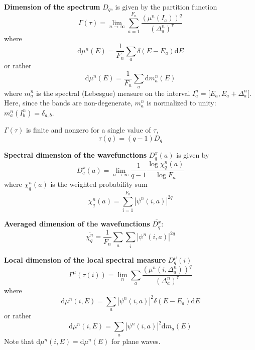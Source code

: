 \documentclass[11pt]{article}
\renewcommand{\d}[1]{\mathrm{d}#1}
\begin{document}
\textbf{Dimension of the spectrum} $\boxed{D_q}$, is given by the partition function
\begin{equation}
	\Gamma(\tau) = \lim_{n\rightarrow \infty} \sum_{a=1}^{F_n} \frac{(\mu^n(I_a))^q}{(\Delta_a^n)^\tau}
\end{equation}
where
\begin{equation}
	\d \mu^n(E) = \frac{1}{F_n}\sum_a \delta(E-E_a) \d E
\end{equation}
or rather
\begin{equation}
	\d \mu^n(E) = \frac{1}{F_n}\sum_a \d{m_a^n}(E)
\end{equation}
where $m_a^n$ is the spectral (Lebesgue) measure on the interval $I_a^n = [E_a,E_a+\Delta_a^n[$.
Here, since the bands are non-degenerate, $m_a^n$ is normalized to unity: $m_a^n(I_b^n)=\delta_{a,b}$.

$\Gamma(\tau)$ is finite and nonzero for a single value of $\tau$, 
\begin{equation}
	\tau(q) = (q-1)D_q
\end{equation}

\textbf{Spectral dimension of the wavefunctions} $\boxed{D^x_q(a)}$ is given by
\begin{equation}
	D^x_q(a) = \lim_{n\rightarrow \infty} \frac{1}{q-1} \frac{\log \chi^n_q(a)}{\log F_n}
\end{equation}
where $\chi^n_q(a)$ is the weighted probability sum
\begin{equation}
	\chi^n_q(a) = \sum_{i=1}^{F_n} |\psi^n(i,a)|^{2q}
\end{equation}

\textbf{Averaged dimension of the wavefunctions} $\boxed{\overline{D^x_q}}$:
\begin{equation}
	\overline{\chi^n_q} = \frac{1}{F_n}\sum_a \sum_i |\psi^n(i,a)|^{2q}
\end{equation}

\textbf{Local dimension of the local spectral measure} $\boxed{D^\mu_q(i)}$
\begin{equation}
	\Gamma^\mu(\tau(i)) = \lim_n \sum_a \frac{\left(\mu^n(i,\Delta_a^n)\right)^q}{(\Delta_a^n)^\tau}
\end{equation}
where
\begin{equation}
	\d \mu^n(i,E) = \sum_a |\psi^n(i,a)|^2 \delta(E-E_a) \d E
\end{equation}
or rather
\begin{equation}
	\d \mu^n(i,E) = \sum_a |\psi^n(i,a)|^2 \d{m_a}(E)
\end{equation}
Note that $\d \mu^n(i,E) = \d \mu^n(E)$ for plane waves.
\end{document}
